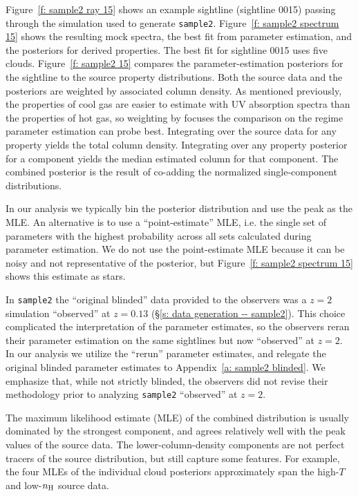 \documentclass[fleqn,usenatbib]{mnras}
\begin{document}
Figure~\ref{f: sample2 ray 15} shows an example sightline (sightline 0015) passing through the simulation used to generate \texttt{sample2}.
Figure~\ref{f: sample2 spectrum 15} shows the resulting mock spectra,
the best fit from parameter estimation,
and the posteriors for derived properties.
The best fit for sightline 0015 uses five clouds.
Figure~\ref{f: sample2 15} compares the parameter-estimation posteriors for the sightline to the source property distributions.
Both the source data and the posteriors are weighted by associated  column density.
As mentioned previously, the properties of cool gas are easier to estimate with UV absorption spectra than the properties of hot gas,
so weighting by  focuses the comparison on the regime parameter estimation can probe best.
Integrating over the source data for any property yields the total  column density.
Integrating over any property posterior for a component yields the median estimated  column for that component.
The combined posterior is the result of co-adding the normalized single-component distributions.

In our analysis we typically bin the posterior distribution and use the peak as the MLE.
An alternative is to use a ``point-estimate'' MLE, i.e. the single set of parameters with the highest probability across all sets calculated during parameter estimation.
We do not use the point-estimate MLE because it can be noisy and not representative of the posterior, but Figure~\ref{f: sample2 spectrum 15} shows this estimate as stars.

In \texttt{sample2} the ``original blinded'' data provided to the observers was a $z=2$ simulation ``observed'' at $z=0.13$ (\S\ref{s: data generation -- sample2}).
This choice complicated the interpretation of the parameter estimates,
so the observers reran their parameter estimation on the same sightlines but now ``observed'' at $z=2$.
In our analysis we utilize the ``rerun'' parameter estimates,
and relegate the original blinded parameter estimates to Appendix~\ref{a: sample2 blinded}.
We emphasize that, while not strictly blinded, the observers did not revise their methodology prior to analyzing \texttt{sample2} ``observed'' at $z=2$.

The maximum likelihood estimate (MLE) of the combined distribution is usually dominated by the strongest component,
and agrees relatively well with the peak values of the source data.
The lower-column-density components are not perfect tracers of the source distribution, but still capture some features.
For example, the four MLEs of the individual cloud posteriors approximately span the high-$T$ and low-$n_{\rm H}$ source data.
\end{document}
